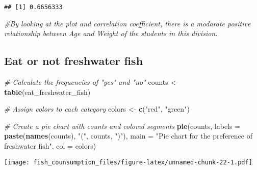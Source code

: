 \documentclass[
]{article}
\newenvironment{Shaded}{\begin{snugshade}}{\end{snugshade}}
\newcommand{\AttributeTok}[1]{\textcolor[rgb]{0.13,0.29,0.53}{#1}}
\newcommand{\CommentTok}[1]{\textcolor[rgb]{0.56,0.35,0.01}{\textit{#1}}}
\newcommand{\FunctionTok}[1]{\textcolor[rgb]{0.13,0.29,0.53}{\textbf{#1}}}
\newcommand{\NormalTok}[1]{#1}
\newcommand{\OtherTok}[1]{\textcolor[rgb]{0.56,0.35,0.01}{#1}}
\newcommand{\SpecialCharTok}[1]{\textcolor[rgb]{0.81,0.36,0.00}{\textbf{#1}}}
\newcommand{\StringTok}[1]{\textcolor[rgb]{0.31,0.60,0.02}{#1}}
\begin{document}
\begin{Shaded}
\end{Shaded}

\begin{verbatim}
## [1] 0.6656333
\end{verbatim}

\begin{Shaded}
\begin{Highlighting}[]
\CommentTok{\#By looking at the plot and correlation coefficient, there is a modarate positive relationship between Age and Weight of the students in this division. }
\end{Highlighting}
\end{Shaded}

\hypertarget{eat-or-not-freshwater-fish}{%
\subsection{Eat or not freshwater
fish}\label{eat-or-not-freshwater-fish}}

\begin{Shaded}
\begin{Highlighting}[]
\CommentTok{\# Calculate the frequencies of "yes" and "no"}
\NormalTok{counts }\OtherTok{\textless{}{-}} \FunctionTok{table}\NormalTok{(eat\_freshwater\_fish)}

\CommentTok{\# Assign colors to each category}
\NormalTok{colors }\OtherTok{\textless{}{-}} \FunctionTok{c}\NormalTok{(}\StringTok{"red"}\NormalTok{, }\StringTok{"green"}\NormalTok{)}

\CommentTok{\# Create a pie chart with counts and colored segments}
\FunctionTok{pie}\NormalTok{(counts, }\AttributeTok{labels =} \FunctionTok{paste}\NormalTok{(}\FunctionTok{names}\NormalTok{(counts), }\StringTok{"("}\NormalTok{, counts, }\StringTok{")"}\NormalTok{), }
    \AttributeTok{main =} \StringTok{"Pie chart for the preference of freshwater fish"}\NormalTok{, }\AttributeTok{col =}\NormalTok{ colors)}
\end{Highlighting}
\end{Shaded}

\texttt{[image: fish\_counsumption\_files/figure-latex/unnamed-chunk-22-1.pdf]}
\end{document}
